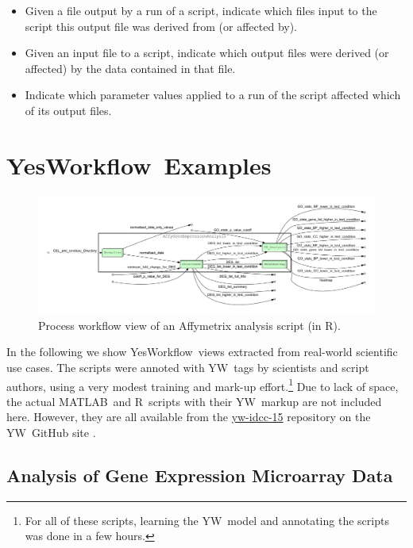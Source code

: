 \documentclass{article}
\newcommand{\YW}{\textsf{YesWorkflow}}
\newcommand{\yw}{\textsf{YW}}
\newcommand{\YWT}{\textsf{YesWorkflow}}
\newcommand{\R}{\textsf{R}}
\newcommand{\MATLAB}{\textsf{MATLAB}}
\begin{document}
\begin{itemize} 

\item Given a file output by a run of a script, indicate which files
  input to the script this output file was derived  from (or affected
  by). 

\item Given an input file to a script, indicate which  output files
  were derived (or affected) by the data contained in that file.

\item Indicate which parameter values applied to a run of the
  script affected which of its output files. 

\end{itemize}



\section{\YWT\ Examples}

 \begin{figure}[t]
   \centering
   \includegraphics[width=.99\textwidth]{figures/Affymetrix_process-crop.pdf}
   \caption{Process workflow view of an
     Affymetrix analysis script (in \R).}
   \label{fig-affymetrics}
 \end{figure}

 In the following we show \YW\ views extracted from real-world
 scientific use cases.  The scripts were annoted with \yw\ tags by
 scientists and script authors, using a very modest training and
 mark-up effort.\footnote{For all of these scripts, learning the \yw\
   model and annotating the scripts was done in a few hours.}  Due to
 lack of space, the actual \MATLAB\ and \R\ scripts with their \yw\
 markup are not included here. However, they are all available from
 the  \href{http://yesworkflow.org/yw-idcc-15}{yw-idcc-15} repository 
on the \yw\ GitHub site \cite{YWgithub2015}.

\subsection{Analysis of Gene Expression Microarray Data}
\end{document}
